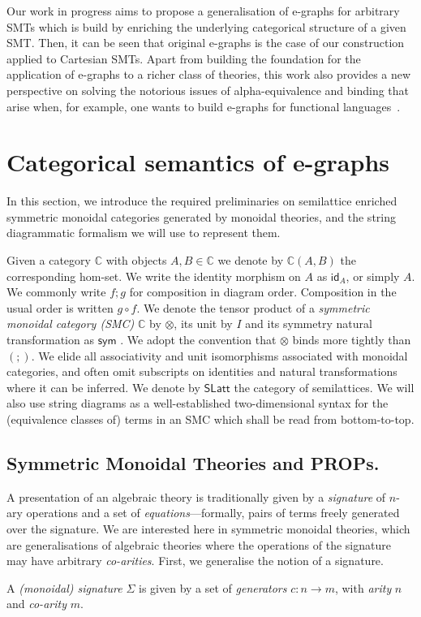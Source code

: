 \documentclass[sigconf, 9pt, nonacm]{acmart}
\newcommand\id{\textsf{id}}
\newcommand\sym{\textsf{sym}}
\begin{document}
Our work in progress aims to propose a generalisation of e-graphs for arbitrary SMTs which is build by enriching the underlying categorical structure of a given SMT.
Then, it can be seen that original e-graphs is the case of our construction applied to Cartesian SMTs.
Apart from building the foundation for the application of e-graphs to a richer class of theories, this work also provides a new perspective on solving the notorious issues of alpha-equivalence and binding that arise when, for example, one wants to build e-graphs for functional languages~\cite{koehler2022sketchguided}.

\section{Categorical semantics of e-graphs}

In this section,  we introduce the required preliminaries on semilattice enriched symmetric monoidal categories generated by monoidal theories,  and the string diagrammatic formalism we will use to represent them.  

Given a category $\mathbb{C}$  with objects $A,B \in \mathbb{C}$ we denote by $\mathbb{C}(A,B)$ the corresponding hom-set.  We write the identity morphism on $A$ as $\id_A$,  or simply $A$.  We commonly write $f;g$ for composition in diagram order.  Composition in the usual order is written $g \circ f$.  We denote the tensor product of a \textit{symmetric monoidal category (SMC)} $\mathbb{C}$ by $\otimes$,  its unit by $I$ and its symmetry natural transformation as $\sym$ \cite{maclane}.  We adopt the convention that $\otimes$ binds more tightly than $(;\!)$.  We elide all associativity and unit isomorphisms associated with monoidal categories,  and often omit subscripts on identities and natural transformations where it can be inferred.  We denote by $\textsf{SLatt}$ the category of semilattices.
We will also use string diagrams as a well-established two-dimensional syntax for the (equivalence classes of) terms in an SMC which shall be read from bottom-to-top.


\subsection{Symmetric Monoidal Theories and PROPs.}

A presentation of an algebraic theory is traditionally given by a \textit{signature} of $n$-ary operations and a set of \textit{equations}---formally,  pairs of terms freely generated over the signature.  We are interested here in symmetric monoidal theories, which are generalisations of algebraic theories where the operations of the signature may have arbitrary \textit{co-arities}.  First,  we generalise the notion of a signature. 
\begin{definition}
A \textit{(monoidal) signature} $\Sigma$ is given by a set of \textit{generators} $c: n \to m$,  with \textit{arity} $n$ and \textit{co-arity} $m$.  %
\end{definition}
\end{document}
